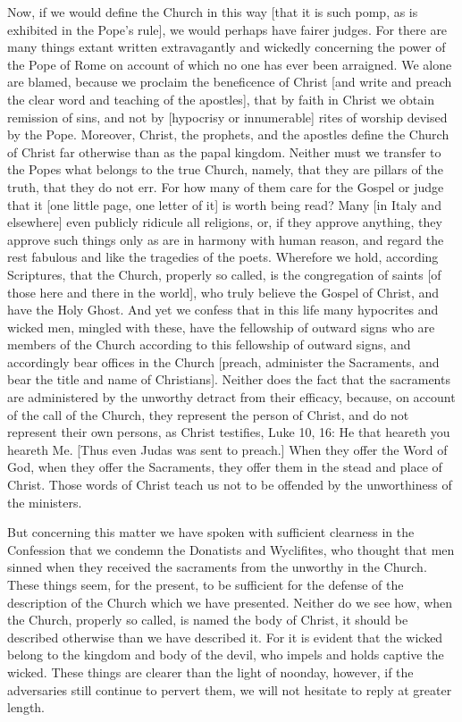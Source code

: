 Now, if we would define the Church in this way [that it is such pomp,
as is exhibited in the Pope's rule], we would perhaps have fairer
judges.  For there are many things extant written extravagantly and
wickedly concerning the power of the Pope of Rome on account of which
no one has ever been arraigned.  We alone are blamed, because we
proclaim the beneficence of Christ [and write and preach the clear
word and teaching of the apostles], that by faith in Christ we obtain
remission of sins, and not by [hypocrisy or innumerable] rites of
worship devised by the Pope.  Moreover, Christ, the prophets, and the
apostles define the Church of Christ far otherwise than as the papal
kingdom.  Neither must we transfer to the Popes what belongs to the
true Church, namely, that they are pillars of the truth, that they do
not err.  For how many of them care for the Gospel or judge that it
[one little page, one letter of it] is worth being read?  Many [in
Italy and elsewhere] even publicly ridicule all religions, or, if
they approve anything, they approve such things only as are in
harmony with human reason, and regard the rest fabulous and like the
tragedies of the poets.  Wherefore we hold, according Scriptures,
that the Church, properly so called, is the congregation of saints
[of those here and there in the world], who truly believe the Gospel
of Christ, and have the Holy Ghost.  And yet we confess that in this
life many hypocrites and wicked men, mingled with these, have the
fellowship of outward signs who are members of the Church according
to this fellowship of outward signs, and accordingly bear offices in
the Church [preach, administer the Sacraments, and bear the title and
name of Christians].  Neither does the fact that the sacraments are
administered by the unworthy detract from their efficacy, because, on
account of the call of the Church, they represent the person of
Christ, and do not represent their own persons, as Christ testifies,
Luke 10, 16: He that heareth you heareth Me.  [Thus even Judas was
sent to preach.] When they offer the Word of God, when they offer the
Sacraments, they offer them in the stead and place of Christ.  Those
words of Christ teach us not to be offended by the unworthiness of
the ministers.

But concerning this matter we have spoken with sufficient clearness
in the Confession that we condemn the Donatists and Wyclifites, who
thought that men sinned when they received the sacraments from the
unworthy in the Church.  These things seem, for the present, to be
sufficient for the defense of the description of the Church which we
have presented.  Neither do we see how, when the Church, properly so
called, is named the body of Christ, it should be described otherwise
than we have described it.  For it is evident that the wicked belong
to the kingdom and body of the devil, who impels and holds captive
the wicked.  These things are clearer than the light of noonday,
however, if the adversaries still continue to pervert them, we will
not hesitate to reply at greater length.

